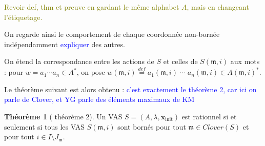 \documentclass[a4paper,final]{article}
\theoremstyle{definition}
\newtheorem{Theorem}{Théorème}
\newcommand{\alain}[1]{\textcolor{blue}{#1}}
\newcommand{\lucas}[1]{\textcolor{olive}{#1}}
\newcommand{\defeq}{\ensuremath{\stackrel{\textit{def}}{=}}}
\newcommand{\clover}{\textit{Clover}}
\newcommand{\vect}[1]{\ensuremath{\mathbf{#1}}}
\newcommand{\xinit}{\ensuremath{\vect{x}_\text{init}}}
\begin{document}
\lucas{Revoir def, thm et preuve en gardant le même alphabet $A$, mais en changeant l'étiquetage.}

\noindent On regarde ainsi le comportement de chaque coordonnée non-bornée indépendamment \alain{expliquer} des autres.

On étend la correspondance entre les actions de $S$ et celles de $S(\mathfrak{m},i)$ aux mots : 
pour $w = a_1\cdots a_n \in A^\ast$, on pose $w(\mathfrak{m},i) \defeq a_1(\mathfrak{m},i) \;\cdots\; a_n(\mathfrak{m},i) \in A(\mathfrak{m},i)^\ast$.

Le théorème suivant est alors obtenu :
\alain{c'est exactement le théorème 2, car ici on parle de Clover, et YG parle des éléments maximaux de KM}

\begin{Theorem}[\cite{giyo80} théorème 2]
    Un VAS   $S=(A,\lambda,\xinit)$ est rationnel si et seulement si 
    tous les VAS $S(\mathfrak{m},i)$ sont bornés pour tout  $\mathfrak{m} \in \clover(S)$ et pour tout $i \in I \setminus J_\mathfrak{m}$.
\end{Theorem}
\end{document}
